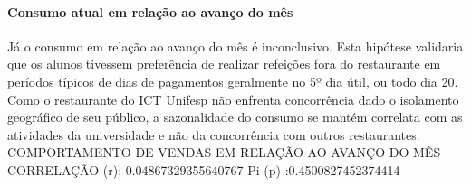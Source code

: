 \documentclass[	12pt, Times, openright, twoside, a4paper, english, brazil]{abntex2}
\begin{document}
              \paragraph{Consumo atual em relação ao avanço do mês}
                Já o consumo em relação ao avanço do mês é inconclusivo. Esta hipótese validaria que os alunos tivessem preferência de realizar refeições fora do restaurante em períodos típicos de dias de pagamentos geralmente no 5º dia útil, ou todo dia 20. Como o restaurante do ICT Unifesp não enfrenta concorrência dado o isolamento geográfico de seu público, a sazonalidade do consumo se mantém correlata com as atividades da universidade e não da concorrência com outros restaurantes.\newline
                COMPORTAMENTO DE VENDAS EM RELAÇÃO AO AVANÇO DO MÊS\newline
                CORRELAÇÃO (r): 0.04867329355640767\newline
                Pi (p) :0.4500827452374414\newline
                \begin{figure}[H]
                    \end{figure}
                
                \begin{figure}[H]
                \end{figure}
\end{document}
